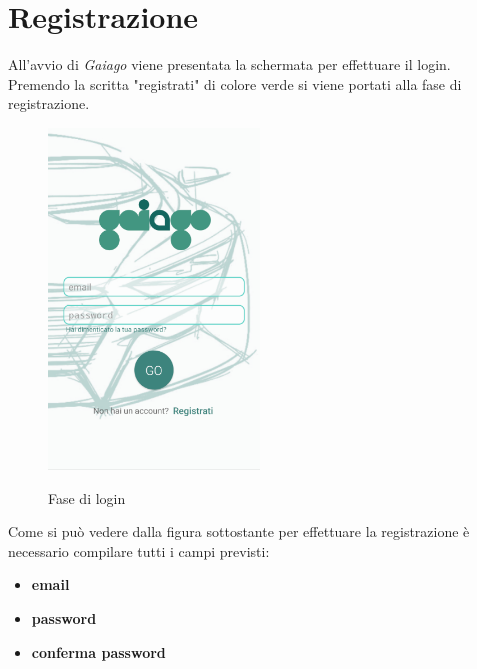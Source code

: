 \section{Registrazione}
All'avvio di \textit{Gaiago} viene presentata la schermata per effettuare il login. Premendo la scritta "registrati" di colore verde si viene portati alla fase di registrazione.
\begin{figure}[H] 
	\centering 
	\includegraphics[width=0.5\textwidth]{res/images/login.png}\\
	\caption{Fase di login}
	\label{Login}
\end{figure}
 \pagebreak
Come si può vedere dalla figura sottostante per effettuare la registrazione è necessario compilare tutti i campi previsti:
\begin{itemize}
	\item \textbf{email}
	\item \textbf{password}
	\item \textbf{conferma password}
\end{itemize} 


